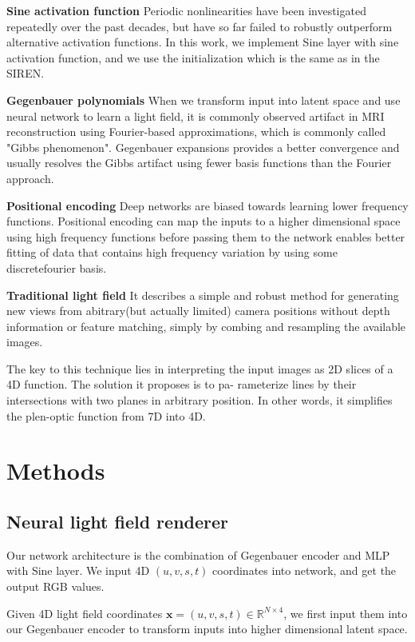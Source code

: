 \documentclass[acmtog]{acmart}
\begin{document}
\quad \textbf{Sine activation function}
    Periodic nonlinearities have been investigated repeatedly over the past decades, but have so far failed to robustly outperform alternative activation functions. In this work, we implement Sine layer with sine activation function, and we use the initialization which is the same as in the SIREN.

\quad \textbf{Gegenbauer polynomials}
    When we transform input into latent space and use neural network to learn a light field, it is commonly observed artifact in MRI reconstruction using Fourier-based approximations, which is commonly called "Gibbs phenomenon". Gegenbauer expansions provides a better convergence and usually resolves the Gibbs artifact using fewer basis functions than the Fourier approach.
    
\quad \textbf{Positional encoding}
    Deep networks are biased towards learning lower frequency functions. Positional encoding can map the inputs to a higher dimensional space using high frequency functions before passing them to the network enables better fitting of data that contains high frequency variation by using some discretefourier basis. 
    
\quad \textbf{Traditional light field}
    It describes a simple and robust method for generating
new views from abitrary(but actually limited) camera positions
without depth information or feature matching, simply by combing
and resampling the available images.

\quad The key to this technique lies in interpreting the input images
as 2D slices of a 4D function. The solution it proposes is to pa-
rameterize lines by their intersections with two planes in arbitrary
position. In other words, it simplifies the plen-optic function from
7D into 4D.

\section{Methods}
\subsection{Neural light field renderer}
    \qquad Our network architecture is the combination of Gegenbauer encoder and MLP with Sine layer. We input 4D $(u,v,s,t)$ coordinates into network, and get the output RGB values.

    \quad Given 4D light field coordinates $\mathbf{x}=(u,v,s,t)\in \mathbb{R}^{N\times 4}$, we first input them into our Gegenbauer encoder to transform inputs into higher dimensional latent space.
\end{document}
